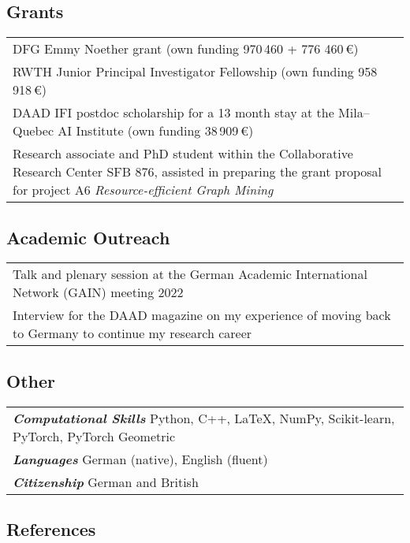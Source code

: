 \documentclass[11pt, a4paper, DIV=12]{scrartcl}
\begin{document}
\subsection*{Grants}
\begin{tabular}{p{14.5cm}}
	DFG Emmy Noether grant (own funding 970\,460 + 776 460\,€)\\[0.5em]
	
	RWTH Junior Principal Investigator Fellowship (own funding 958\,918\,€)\\[0.5em]

	DAAD IFI postdoc scholarship for a 13 month stay at the Mila--Quebec AI Institute (own funding 38\,909\,€)\\[0.5em]
		
	Research associate and PhD student  within the Collaborative Research Center SFB 876, assisted in preparing the  grant proposal for project A6 \emph{Resource-efficient Graph Mining}
\end{tabular}

\subsection*{Academic Outreach}

\begin{tabular}{p{14.5cm}}
	Talk and plenary session at the German Academic International Network (GAIN) meeting 2022 \\[0.5em]
	
	Interview for the DAAD magazine on my experience of moving back to Germany to continue my research career
\end{tabular}

\subsection*{Other}

\begin{tabular}{l}
	\textsf{\textbf{\em Computational Skills}} Python, C\hspace{-1pt}+\hspace{-1pt}+, \LaTeX, NumPy, Scikit-learn, PyTorch, PyTorch Geometric\\
	\textsf{\textbf{\em Languages}} German (native), English (fluent)\\
	\textsf{\textbf{\em Citizenship}} German and British
\end{tabular}

\subsection*{References}
\end{document}
